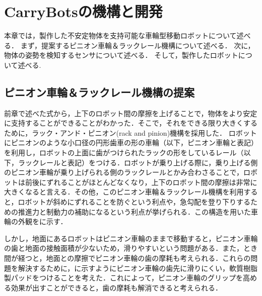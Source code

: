 \chapter{CarryBotsの機構と開発}
本章では，製作した不安定物体を支持可能な車輪型移動ロボットについて述べる．
まず，提案するピニオン車輪＆ラックレール機構について述べる．
次に，物体の姿勢を検知するセンサについて述べる．
そして，製作したロボットについて述べる.

\section{ピニオン車輪＆ラックレール機構の提案}
前章で述べた式から，上下のロボット間の摩擦を上げることで，物体をより安定に支持することができることがわかった．そこで，それをできる限り大きくするために，ラック・アンド・ピニオン(rack and pinion)機構を採用した．
ロボットにピニオンのような小口径の円形歯車の形の車輪（以下，ピニオン車輪と表記）を利用し，ロボットの上面に歯がつけられたラックの形をしているレール（以下，ラックレールと表記）をつける．ロボットが乗り上げる際に，乗り上げる側のピニオン車輪が乗り上げられる側のラックレールとかみ合わさることで，ロボットは前後にずれることがほとんどなくなり，上下のロボット間の摩擦は非常に大きくなると言える．その他，このピニオン車輪＆ラックレール機構を利用すると，ロボットが斜めにずれることを防ぐという利点や，急勾配を登り下りするための推進力と制動力の補助になるという利点が挙げられる．この構造を用いた車輪の外観をに示す．

しかし，地面にあるロボットはピニオン車輪のままで移動すると，ピニオン車輪の歯と地面の接触面積が少ないため，滑りやすいという問題がある．また，とき間が経つと，地面との摩擦でピニオン車輪の歯の摩耗も考えられる．これらの問題を解決するために，に示すようにピニオン車輪の歯先に滑りにくい，軟質樹脂製パッドをつけることを考えた．これによって，ピニオン車輪のグリップを高める効果が出すことができると，歯の摩耗も解消できると考えられる．

